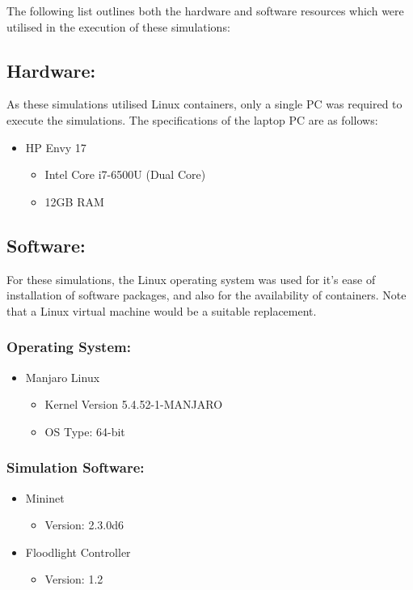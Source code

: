 The following list outlines both the hardware and software resources which were
utilised in the execution of these simulations:

\subsection{Hardware:}

As these simulations utilised Linux containers, only a single PC was required to
execute the simulations. The specifications of the laptop PC are as follows:

\begin{itemize}
	\item HP Envy 17
	\begin{itemize}
		\item Intel Core i7-6500U (Dual Core)
		\item 12GB RAM
	\end{itemize}
\end{itemize}

\subsection{Software:}

For these simulations, the Linux operating system was used for it's ease of
installation of software packages, and also for the availability of containers.
Note that a Linux virtual machine would be a suitable replacement.

\subsubsection{Operating System:}

\begin{itemize}
	\item Manjaro Linux
	\begin{itemize}
		\item Kernel Version 5.4.52-1-MANJARO
		\item OS Type: 64-bit
	\end{itemize}
\end{itemize}

\subsubsection{Simulation Software:}

\begin{itemize}
	\item Mininet
	\begin{itemize}
		\item Version: 2.3.0d6
	\end{itemize}
	\item Floodlight Controller
	\begin{itemize}
		\item Version: 1.2
	\end{itemize}
\end{itemize}
